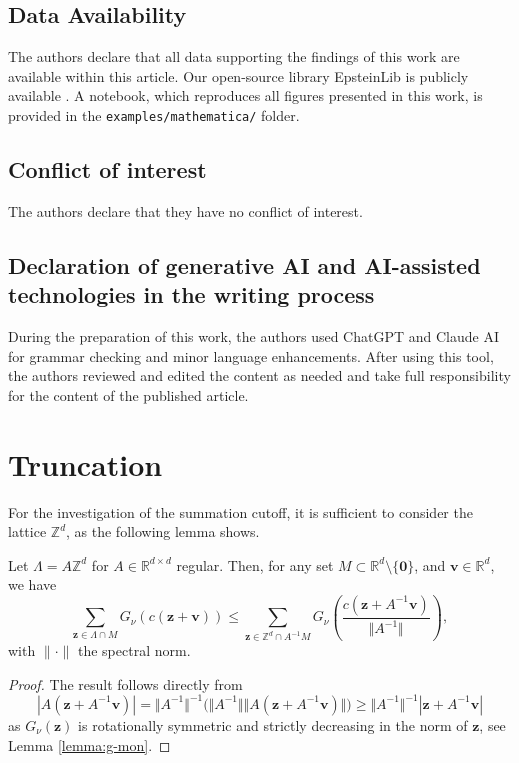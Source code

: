 \documentclass[]{amsart}
\numberwithin{mythm}{section}
\begin{document}
\subsection*{Data Availability}
The authors declare that all data supporting the findings of this work are available within this article. Our open-source library EpsteinLib is publicly available \cite{epsteinlib}.
A notebook, which reproduces all figures presented in this work, is provided in the \texttt{examples/mathematica/} folder.


\subsection*{Conflict of interest}
The authors declare that they have no conflict of interest.

\subsection*{Declaration of generative AI and AI-assisted technologies in the writing process}
During the preparation of this work, the authors used ChatGPT and Claude AI for grammar checking and minor language enhancements. After using this tool, the authors reviewed and edited the content as needed and take full responsibility for the content of the published article.




\appendix



\section{Truncation}
\label{sec:appendix-trunc}

For the investigation of the summation cutoff, it is sufficient to consider the lattice $\mathds{Z}^d$, as the following lemma shows.

\begin{lemma}
\label{lem:z-is-enough-revisited}
Let $\Lambda=A\mathds Z^d$ for $A\in\mathds R^{d\times d}$ regular.
Then, for any set $M\subset\mathds R^d\setminus\{\bm 0\}$,
and $\bm v\in\mathds R^d$, we have
\[\sum_{\bm z \in \Lambda \cap M} G_\nu(c(\bm z+\bm v)) \leq \sum_{\bm z \in \mathds{Z}^d \cap A^{-1}M} G_\nu\left(\frac{c(\bm z +A^{-1}\bm v)}{\Vert A^{-1}\Vert} \right),\]
with $\|\cdot\|$ the spectral norm.
\end{lemma}


\begin{proof}
The result follows directly from
\[|A(\bm z + A^{-1} \bm v)|= \Vert A^{-1}\Vert^{-1}\big(\Vert A^{-1}\Vert\Vert A (\bm z+A^{-1}\bm v)\Vert\big) \ge \Vert A^{-1}\Vert^{-1} |\bm z+A^{-1}\bm v|\]
as $G_\nu(\bm z)$ is rotationally symmetric and strictly decreasing in the norm of $\bm z$, see Lemma \ref{lemma:g-mon}.
\end{proof}
\end{document}
